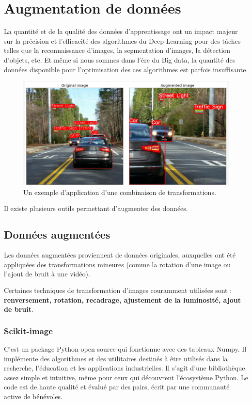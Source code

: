 \section{Augmentation de données}

La quantité et de la qualité des données d'apprentissage ont un impact majeur sur la précision et l’efficacité des algorithmes du Deep Learning pour des tâches telles que la reconnaissance d'images, la segmentation d'images, la détection d'objets, etc.
Et même si nous sommes dans l’ère du Big data, la quantité des données disponible pour l'optimisation des ces algorithmes est parfois insuffisante.

\begin{figure}[H]
    \center
    \includegraphics[width=\textwidth]{./images/transfo_combi.png}
    \caption{Un exemple d'application d'une combinaison de transformations.}
    \label{fig:exemple_transfo}
\end{figure}


\noindent Il existe plusieurs outils permettant d'augmenter des données.

\subsection{Données augmentées}

Les données augmentées proviennent de données originales, auxquelles ont été appliquées des transformations mineures (comme la rotation d’une image ou l’ajout de bruit à une vidéo).

Certaines techniques de transformation d’images couramment utilisées sont : \textbf{renversement, rotation, recadrage, ajustement de la luminosité, ajout de bruit}.

\subsubsection{Scikit-image}
C'est un package Python open source qui fonctionne avec des tableaux Numpy. Il implémente des algorithmes et des utilitaires destinés à être utilisés dans la recherche, l'éducation et les applications industrielles.
Il s'agit d'une bibliothèque assez simple et intuitive, même pour ceux qui découvrent l'écosystème Python. Le code est de haute qualité et évalué par des pairs, écrit par une communauté active de bénévoles.

